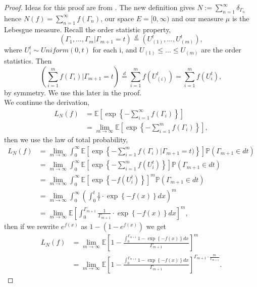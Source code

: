 \documentclass[11pt, oneside]{article}   	%
\theoremstyle{definition}
\theoremstyle{remark}
\begin{document}
\begin{proof}
  Ideas for this proof are from \cite{resnick2005}. The new definition gives $N := \sum_{n=1}^\infty \delta_{\Gamma_n}$ hence $N(f)=\sum_{n=1}^\infty f(\Gamma_n)$, our space $E = [0,\infty)$ and our measure $\mu$ is the Lebesgue measure.
  Recall the order statistic property, $$(\Gamma_1,...,\Gamma_m|\Gamma_{m+1}=t) \stackrel{d}{=} (U_{(1)}^t,...,U_{(m)}^t),$$ where $U_i^t \sim \textit{Uniform}(0,t)$ for each i, and $U_{(1)} \leq ... \leq U_{(m)}$ are the order statistics. Then $$\left(\sum_{i=1}^m f(\Gamma_i)| \Gamma_{m+1}=t\right) \stackrel{d}{=} \sum_{i=1}^m f(U_{(i)}^t) = \sum_{i=1}^m f(U_i^t),$$
  by symmetry. We use this later in the proof. \\
  We continue the derivation,
  \begin{align*}
    L_N(f) &= \mathbb{E} \left[ \exp \left\{-\sum_{i=1}^\infty f(\Gamma_i) \right\} \right] \\
	   &= \lim_{m \to \infty} \mathbb{E} \left[ \exp \left\{-\sum_{i=1}^m f(\Gamma_i) \right\} \right],
  \end{align*}
  then we use the law of total probability,
  \begin{align*}
    L_N(f) &= \lim_{m \to \infty} \int_0^\infty \mathbb{E} \left[ \exp \left\{-\sum_{i=1}^m f(\Gamma_i) | \Gamma_{m+1}=t) \right\} \right] \mathbb{P}(\Gamma_{m+1} \in d t) \\
	   &= \lim_{m \to \infty} \int_0^\infty \mathbb{E} \left[ \exp \left\{-\sum_{i=1}^m f(U_i^t) \right\} \right] \mathbb{P}(\Gamma_{m+1} \in d t) \\ 
	   &= \lim_{m \to \infty} \int_0^\infty \mathbb{E} \left[ \exp \left\{-f(U_i^t) \right\} \right]^m \mathbb{P}(\Gamma_{m+1} \in d t) \\ 
	   &= \lim_{m \to \infty} \int_0^\infty \left( \int_0^t \frac{1}{t} \cdot \exp \left\{-f(x) \right\} d x \right)^m \\ 
	   &= \lim_{m \to \infty} \mathbb{E} \left[ \int_0^{\Gamma_{m+1}} \frac{1}{\Gamma_{m+1}} \cdot \exp \left\{-f(x) \right\} d x \right]^m,
  \end{align*}
  then if we rewrite $e^{f(x)}$ as $1-(1-e^{f(x)})$ we get
  \begin{align*}
  L_N(f) &= \lim_{m \to \infty} \mathbb{E} \left[ 1- \frac{\int_0^{\Gamma_{m+1}} 1- \exp \left\{-f(x) \right\} d x }{\Gamma_{m+1}} \right]^m \\
	 &= \lim_{m \to \infty} \mathbb{E} \left[ 1- \frac{\int_0^{\Gamma_{m+1}} 1- \exp \left\{-f(x) \right\} d x }{\Gamma_{m+1}} \right]^{\Gamma_{m+1} \cdot \frac{m}{\Gamma_{m+1}}}.

\end{align*}
\end{proof}
\end{document}
